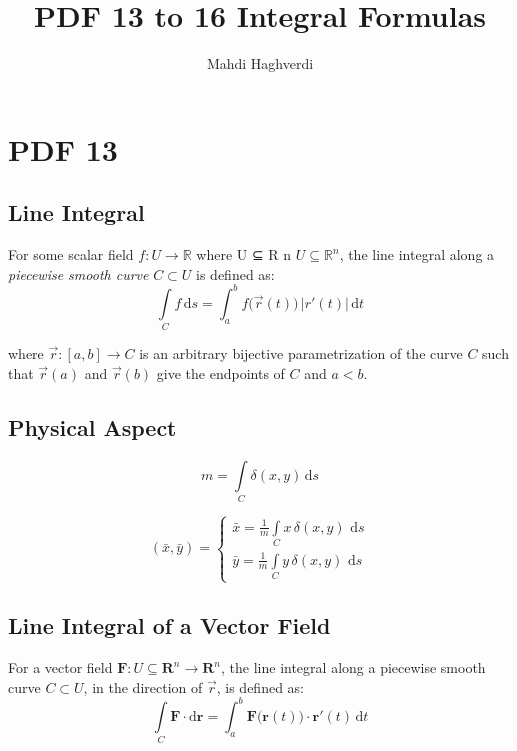 \documentclass[12pt, fleqn]{book}
\title{PDF 13 to 16 Integral Formulas}
\author{Mahdi Haghverdi}
\newcommand{\D}{\mathrm{d}}
\newcommand{\ic}{\int\limits_C}
\newcommand{\F}{\mathbf{F}}
\newcommand{\R}{\mathbf{R}}
\newcommand{\br}{\mathbf{r}}
\newcommand{\xy}{(x, y)}
\begin{document}
	\maketitle
	\tableofcontents
\chapter{PDF 13}\label{pdf13}
	\section{Line Integral}
		For some scalar field $f\colon U\to \mathbb {R}$ where U ⊆ R n $U\subseteq \mathbb {R}^{n}$, the line integral along a \textit{piecewise smooth curve} $C\subset U$ is defined as:
		\begin{equation}
			\ic  f \, \D s = \int_{a}^{b} f\big(\vec{r}(t)\big) \, \lvert r'(t) \lvert \, \D t
		\end{equation}	
		
	    where $\vec{r} \colon [a,b]\to C$ is an arbitrary bijective parametrization of the curve $C$ such that $\vec{r}(a)$ and $\vec{r}(b)$ give the endpoints of $C$ and $a < b$.
    
	\section{Physical Aspect}
		\begin{equation}
			m = \ic  \delta \xy \, \D s
		\end{equation}
		
		\begin{equation}
			(\bar{x}, \bar{y}) = 
			\begin{cases}
					\bar{x} = \frac{1}{m} \ic  x \, \delta\xy \, \, \D s \\
					\bar{y} = \frac{1}{m} \ic  y \, \delta\xy \, \, \D s
			\end{cases}
		\end{equation}
	
	\section{Line Integral of a Vector Field}
		For a vector field $\F \colon U \subseteq \R^{n} \to \R^{n}$, the line integral along a piecewise smooth curve $C \subset U$, in the direction of $\vec{r}$, is defined as:
		\begin{equation}
			\ic  \F \cdot \D \br = \int_{a}^{b} \F\big(\br(t)\big) \cdot \br'(t) \, \D t
		\end{equation}
		
\end{document}
